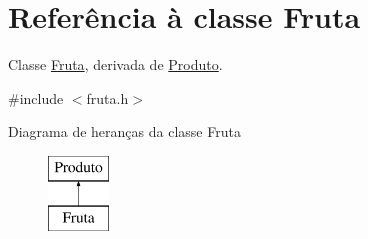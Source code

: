 \hypertarget{classFruta}{\section{Referência à classe Fruta}
\label{classFruta}
}


Classe \hyperlink{classFruta}{Fruta}, derivada de \hyperlink{classProduto}{Produto}.  




{\ttfamily \#include $<$fruta.\-h$>$}

Diagrama de heranças da classe Fruta\begin{figure}[H]
\begin{center}
\leavevmode
\includegraphics[height=2.000000cm]{d4/d5f/classFruta}
\end{center}
\end{figure}
